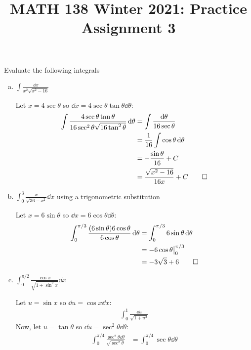 \documentclass{agony}
\title{MATH 138 Winter 2021: Practice Assignment 3}
\begin{document}
\begin{prob}
  Evaluate the following integrals
\end{prob}
\begin{enumerate}[(a)]
  \item $\displaystyle\int \frac{\dd x}{x^2\sqrt{x^2 - 16}}$
        \begin{sol}
          Let $x = 4\sec\theta$ so $\dd{x} = 4\sec\theta\tan\theta\dd{\theta}$:
          \begin{align*}
            \int \frac{4\sec\theta\tan\theta}{16\sec^2\theta\sqrt{16\tan^2\theta}} \dd{\theta}
             & = \int \frac{\dd\theta}{16\sec\theta}      \\
             & = \frac{1}{16} \int \cos\theta \dd{\theta} \\
             & = -\frac{\sin\theta}{16} + C               \\
             & = \frac{\sqrt{x^2-16}}{16x} + C \qedhere
          \end{align*}
        \end{sol}
  \item $\displaystyle\int_0^3 \frac{x}{\sqrt{36 - x^2}} \dd{x}$
        using a trigonometric substitution
        \begin{sol}
          Let $x = 6\sin\theta$ so $\dd{x} = 6\cos\theta\dd{\theta}$:
          \begin{align*}
            \int_0^{\pi/3} \frac{(6\sin\theta)6\cos\theta}{6\cos\theta} \dd{\theta}
             & = \int_0^{\pi/3} 6\sin\theta \dd{\theta} \\
             & = -6\cos\theta \big|_0^{\pi/3}           \\
             & = -3\sqrt{3} + 6 \qedhere
          \end{align*}
        \end{sol}
  \item $\displaystyle\int_0^{\pi/2} \frac{\cos x}{\sqrt{1 + \sin^2 x}} \dd{x}$
        \begin{sol}
          Let $u = \sin x$ so $\dd{u} = \cos x\dd{x}$:
          \begin{align*}
            \int_0^{1} \frac{\dd{u}}{\sqrt{1 + u^2}}
          \end{align*}
          Now, let $u = \tan\theta$ so $\dd{u} = \sec^2\theta\dd{\theta}$:
          \begin{align*}
            \int_0^{\pi/4} \frac{\sec^2\theta\dd{\theta}}{\sqrt{\sec^2\theta}}
             & = \int_0^{\pi/4} \sec\theta\dd{\theta}          \\

\end{align*}
\end{sol}
\end{enumerate}
\end{document}
